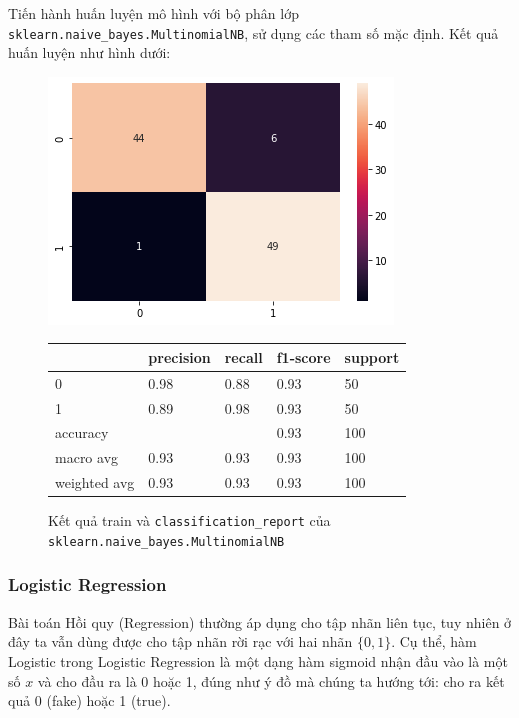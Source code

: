 \documentclass[12pt]{article}
\begin{document}
Tiến hành huấn luyện mô hình với bộ phân lớp \texttt{sklearn.naive\_bayes.MultinomialNB}, sử dụng các tham số mặc định. Kết quả huấn luyện như hình dưới:
\begin{figure}[H]
	\begin{multicols}{2}
		\includegraphics[scale=.5]{img/train-mnb-result.png}

		\begin{table}[H]
			\begin{tabular}{l l l l l}
				\hline
				& precision & recall & f1-score & support \\
				\hline
				0 & 0.98 & 0.88 & 0.93 & 50 \\
				1 & 0.89 & 0.98 & 0.93 & 50 \\
				accuracy &   &   & 0.93 & 100 \\
				macro avg & 0.93 & 0.93 & 0.93 & 100 \\
				weighted avg & 0.93 & 0.93 & 0.93 & 100 \\
				\hline
			\end{tabular}
		\end{table}
	\end{multicols}
	\caption{Kết quả train và \texttt{classification\_report} của \texttt{sklearn.naive\_bayes.MultinomialNB}}
\end{figure}

\subsubsection{Logistic Regression}
Bài toán Hồi quy (Regression) thường áp dụng cho tập nhãn liên tục, tuy nhiên ở đây ta vẫn dùng được cho tập nhãn rời rạc với hai nhãn $\{0, 1\}$. Cụ thể, hàm Logistic trong Logistic Regression là một dạng hàm sigmoid nhận đầu vào là một số $x$ và cho đầu ra là 0 hoặc 1, đúng như ý đồ mà chúng ta hướng tới: cho ra kết quả 0 (fake) hoặc 1 (true).
\end{document}

